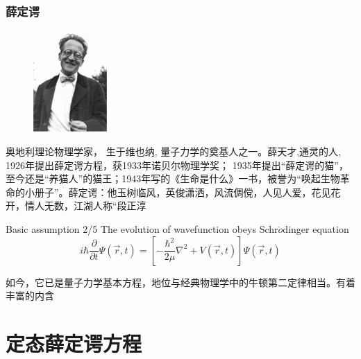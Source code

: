 \begin{frame}
    \frametitle{薛定谔}
    \begin{figure} %
        \includegraphics[width=0.25\textwidth]{figs/schroginger.png}   
    \end{figure}
奥地利理论物理学家， 生于维也纳, 量子力学的奠基人之一。薛天才,通灵的人, 1926年提出薛定谔方程，获1933年诺贝尔物理学奖； 1935年提出“薛定谔的猫”，至今还是“养猫人”的猫王；1943年写的《生命是什么》一书，被誉为“唤起生物革命的小册子”。薛定谔：他玉树临风，英俊潇洒，风流倜傥，人见人爱，花见花开，情人无数，江湖人称“段正淳
\end{frame}

\begin{frame}
    \begin{tcolorbox1}{Basic assumption 2/5}
        The evolution of wavefunction obeys Schr$\ddot{o}$dinger equation
        \begin{equation*}
            i\hbar \frac{\partial }{\partial t} \Psi (\overrightarrow{r},t ) =\left [ -\frac{\hbar^2}{2\mu }\nabla ^2 + V(\overrightarrow{r},t ) \right ]\Psi (\overrightarrow{r}, t ) 
        \end{equation*}
    \end{tcolorbox1}
    如今，它已是量子力学基本方程，地位与经典物理学中的牛顿第二定律相当。有着丰富的内含
\end{frame}

\section{定态薛定谔方程}

